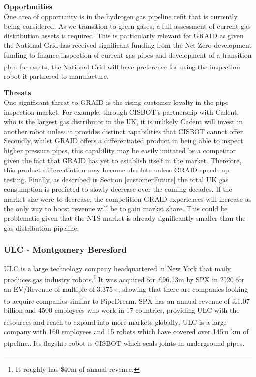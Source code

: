 \documentclass[11pt]{article}		%
\newcommand{\supercite}[1]{\textsuperscript{\cite{#1}}}		%
\newcommand{\sectref}[1]{\hyperref[#1]{Section \ref*{#1}}}     %
\begin{document}
	        \textbf{Opportunities}\\
	        One area of opportunity is in the hydrogen gas pipeline refit that is currently being considered. As we transition to green gases, a full assessment of current gas distribution assets is required. This is particularly relevant for GRAID as given the National Grid has received significant funding from the Net Zero development funding to finance inspection of current gas pipes and development of a transition plan for assets\supercite{developmentfund}, the National Grid will have preference for using the inspection robot it partnered to manufacture.
	        
	        \textbf{Threats} \\
	        One significant threat to GRAID is the rising customer loyalty in the pipe inspection market. For example, through CISBOT's partnership with Cadent, who is the largest gas distributor in the UK, it is unlikely Cadent will invest in another robot unless it provides distinct capabilities that CISBOT cannot offer. Secondly, whilst GRAID offers a differentiated product in being able to inspect higher pressure pipes, this capability may be easily imitated by a competitor given the fact that GRAID has yet to establish itself in the market. Therefore, this product differentiation may become obsolete unless GRAID speeds up testing.
	        Finally, as described in \sectref{customerFuture} the total UK gas consumption is predicted to slowly decrease over the coming decades. If the market size were to decrease, the competition GRAID experiences will increase as the only way to boost revenue will be to gain market share. This could be problematic given that the NTS market is already significantly smaller than the gas distribution pipeline.  
	        
     	\subsubsection[ULC]{ULC - Montgomery Beresford}
     	
     	ULC is a large technology company headquartered in New York that maily produces gas industry robots.\footnote{It roughly has \$40m of annual revenue.\supercite{SPX_acquisition}} It was acquired for £96.13m by SPX in 2020 for an EV/Revenue of multiple of 3.375$\times$, showing that there are companies looking to acquire companies similar to PipeDream\supercite{SPX_multiple}. SPX has an annual revenue of £1.07 billion and 4500 employees who work in 17 countries, providing ULC with the resources and reach to expand into more markets globally\supercite{SPX_acquisition}. ULC is a large company with 160 employees and  15 robots which have covered over 145m km of pipeline.\supercite{ULC_news}. Its flagship robot is CISBOT which seals joints in underground pipes.%
     	
\end{document}
